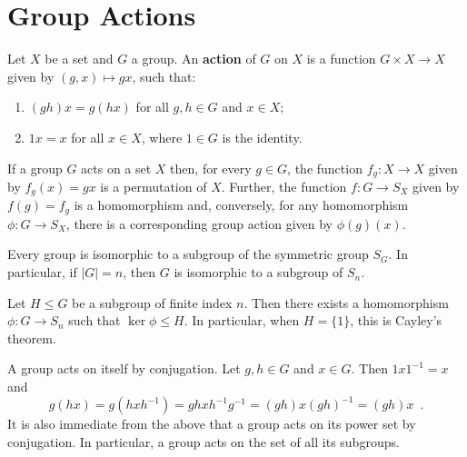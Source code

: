 \chapter{Group Actions}
\label{app:group-actions}

\begin{definition}
	\cite[99]{Rotman1967}
	\cite[41]{DummitFoote2004}
	Let $X$ be a set and $G$ a group. An \textbf{action} of $G$ on $X$ is a function
	$G \times X \to X$ given by $(g, x) \mapsto gx$, such that:
	\begin{enumerate}
		\item $(gh)x = g(hx)$ for all $g, h \in G$ and $x \in X$;
		\item $1x = x$ for all $x \in X$, where $1 \in G$ is the identity.
	\end{enumerate}
\end{definition}

\begin{proposition}
	\cite[99]{Rotman1967}
	\cite[42]{DummitFoote2004}
	If a group $G$ acts on a set $X$ then, for every $g \in G$, the function
	$f_g : X \to X$ given by $f_g(x) = gx$ is a permutation of $X$. Further, the function
	$f : G \to S_X$ given by $f(g) = f_g$ is a homomorphism and, conversely, for any
	homomorphism $\phi : G \to S_X$, there is a corresponding group action given by
	$\phi(g)(x)$.
\end{proposition}

\begin{theorem}[Cayley]
	\cite[96]{Rotman1967}
	\cite[120]{DummitFoote2004}
	Every group is isomorphic to a subgroup of the symmetric group $S_G$. In particular,
	if $|G| = n$, then $G$ is isomorphic to a subgroup of $S_n$.
\end{theorem}

\begin{theorem}
	\cite[97]{Rotman1967}
	Let $H \leq G$ be a subgroup of finite index $n$. Then there exists a homomorphism
	$\phi : G \to S_n$ such that $\ker \phi \leq H$. In particular, when $H = \{ 1 \}$,
	this is Cayley's theorem.
\end{theorem}

\begin{example}
	\cite[122]{DummitFoote2004}
	A group acts on itself by conjugation. Let $g, h \in G$ and $x \in G$. Then
	$1 x 1^{-1} = x$ and
	\begin{equation}
		g(hx) = g(h x h^{-1}) = gh x h^{-1}g^{-1} = (gh) x (gh)^{-1} = (gh)x \enspace.
	\end{equation}
	It is also immediate from the above that a group acts on its power set by conjugation.
	In particular, a group acts on the set of all its subgroups.
\end{example}

